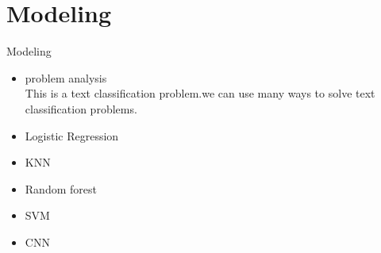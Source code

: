 \documentclass[
 size=12pt,
 paper=smartboard, %
 mode=present, %
 display=slides, %
style=tuliplab,
pauseslide,
fleqn,leqno]{powerdot}
\begin{document}


\section{Modeling}

\begin{slide}[toc=,bm=]{Modeling}
\begin{itemize}
  \item problem analysis\\
\vspace{0.5cm}
This is a text classification problem.we can use  many ways to solve text classification problems.
\vspace{1cm}
  \item  Logistic Regression
  \item  KNN
  \item  Random forest
  \item  SVM
  \item  CNN
\end{itemize}
\end{slide}
\end{document}
